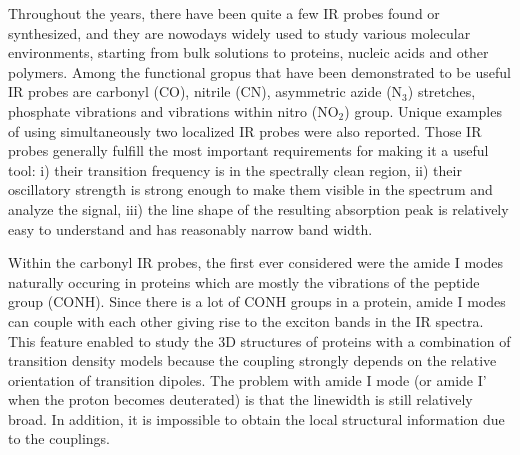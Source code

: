 \documentclass[a4paper,titlepage,twoside,fleqn,12pt]{book}
\begin{document}
\begin{refsection}
Throughout the years, there have been quite a few IR probes found or synthesized, and
they are nowodays widely used to study various molecular environments, starting from bulk solutions
to proteins, nucleic acids and other polymers.\citep{Kim.Cho.ChemRev.2013,
Ma.Pazos.Zhang.Culik.Gai.AnnuRevPhysChem.2015,Waegele.Culik.Gai.JPCL.2011}
Among the functional gropus that have been demonstrated to be useful IR probes
are carbonyl (CO)\citep{Fried.Bagchi.Boxer.Science.2014,Thielges.Axup.Wong.Lee.Chung.Schultz.Fayer.JPCB.2011}, 
nitrile (CN)\citep{Zhang.Markiewicz.Doerksen.Smith.Gai.PCCP.2015,Johnson.Londergan.Charkoudian.JACS.2014,
Waegele.Culik.Gai.JPCL.2011,Stafford.Ensign.Webb.JPCB.2010,
Silverman.Pitzer.Ankomah.Boxer.Fenlon.JPCB.2007,Suydam.Snow.Pande.Boxer.Science.2006},
asymmetric azide (N$_3$)\citep{Thielges.Axup.Wong.Lee.Chung.Schultz.Fayer.JPCB.2011,
Ye.Zaitseva.Caltabiano.Schertler.Sakmar.Deupi.Vogel.Nature.2010,Waegele.Culik.Gai.JPCL.2011,
Taskent-Sezgin.Chung.Banerjee.Nagarajan.Dyer.Carrico.Raleigh.AngewChemInt.2010,Oh.Lee.Joo.Han.Cho.JPCB.2008} 
stretches, phosphate vibrations\citep{Levinson.Bolte.Miller.Corcelli.Boxer.JACS.2011}
and vibrations within nitro (NO$_2$) group\citep{Smith.Linderman.Luskin.Brewer.JPCB.2011}. 
Unique examples of using simultaneously two localized IR probes
were also reported.\citep{Thielges.Axup.Wong.Lee.Chung.Schultz.Fayer.JPCB.2011}
Those IR probes
generally fulfill the most important requirements for making it a useful tool: i) their transition
frequency is in the spectrally clean region, ii) their oscillatory strength is strong enough
to make them visible in the spectrum and analyze the signal, iii) the line shape 
of the resulting absorption peak is relatively easy to understand and has reasonably
narrow band width. 

Within the carbonyl IR probes, the first ever considered were the amide I modes
naturally occuring in proteins which are mostly the vibrations of the peptide group (CONH). Since
there is a lot of CONH groups in a protein, amide I modes can couple with each other
giving rise to the exciton bands in the IR spectra. This feature enabled to study 
the 3D structures of proteins with a combination of transition density
models\citep{Hayashi.Mukamel.JPCB.2007} because the coupling strongly depends 
on the relative orientation of transition dipoles. 
The problem with amide I mode (or amide I' when the proton becomes deuterated)
is that the linewidth is still relatively broad. In addition, it is impossible to
obtain the local structural information due to the couplings.


\end{refsection}
\end{document}
